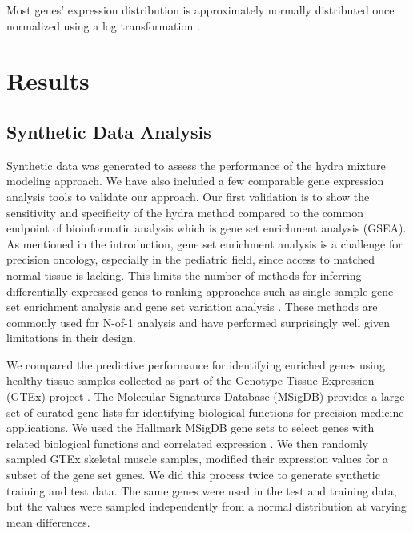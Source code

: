 \documentclass[fleqn,10pt]{wlscirep}
\begin{document}
Most genes' expression distribution is approximately normally distributed once normalized using a log transformation \cite{zwiener2014transforming}. 


\section*{Results}

\subsection*{Synthetic Data Analysis}
Synthetic data was generated to assess the performance of the hydra mixture modeling approach. We have also included a few comparable gene expression analysis tools to validate our approach. Our first validation is to show the sensitivity and specificity of the hydra method compared to the common endpoint of bioinformatic analysis which is gene set enrichment analysis (GSEA). As mentioned in the introduction, gene set enrichment analysis is a challenge for precision oncology, especially in the pediatric field, since access to matched normal tissue is lacking. This limits the number of methods for inferring differentially expressed genes to ranking approaches such as single sample gene set enrichment analysis \cite{barbie2009systematic} and gene set variation analysis \cite{hanzelmann2013gsva}. These methods are commonly used for N-of-1 analysis and have performed surprisingly well given limitations in their design.

We compared the predictive performance for identifying enriched genes using healthy tissue samples collected as part of the Genotype-Tissue Expression (GTEx) project \cite{lonsdale2013genotype}. The Molecular Signatures Database (MSigDB) provides a large set of curated gene lists for identifying biological functions for precision medicine applications. We used the Hallmark MSigDB gene sets to select genes with related biological functions and correlated expression \cite{liberzon2015molecular}. We then randomly sampled GTEx skeletal muscle samples, modified their expression values for a subset of the gene set genes. We did this process twice to generate synthetic training and test data. The same genes were used in the test and training data, but the values were sampled independently from a normal distribution at varying mean differences. 
\end{document}
